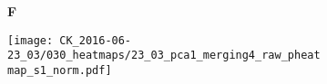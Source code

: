 \documentclass[a4paper, 12pt]{article}
\begin{document}
\begin{figure}[!thb]
\centering

    \caption{Heatmap - data 23}
    \begin{subfigure}[t]{0.02\textwidth}
    \vskip 0pt
        \textbf{\textsf{\normalsize F}}
    \end{subfigure}
    \begin{subfigure}[t]{0.97\textwidth}
    \vskip 0pt
    \caption{}
        \texttt{[image: CK\_2016-06-23\_03/030\_heatmaps/23\_03\_pca1\_merging4\_raw\_pheatmap\_s1\_norm.pdf]}
    \end{subfigure}
    
\end{figure}
\end{document}
